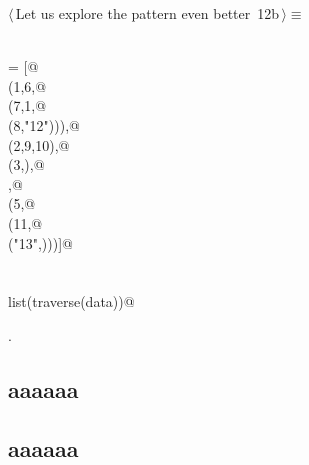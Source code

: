 \documentclass[11pt,oneside]{article}	%
\begin{document}
\begin{flushleft} \small \label{scrap28}
\protect{}$\langle\,$Let us explore the pattern even better\nobreak\ {\footnotesize 12b}$\,\rangle\equiv$
\vspace{-1ex}
\begin{list}{}{} \item
\mbox{}\verb@@\\
\mbox{}\verb@data = [@\\
\mbox{}\verb@   (1,6,@\\
\mbox{}\verb@      (7,1,@\\
\mbox{}\verb@         (8,"12"))),@\\
\mbox{}\verb@   (2,9,10),@\\
\mbox{}\verb@   (3,),@\\
\mbox{},@\\
\mbox{}\verb@   (5,@\\
\mbox{}\verb@      (11,@\\
\mbox{}\verb@      ("13",)))]@\\
\mbox{}\verb@@\\
\mbox{}\verb@@\\
\mbox{}\verb@print list(traverse(data))@\\
\mbox{}\verb@@{\NWsep}
\end{list}
\vspace{-1ex}
\footnotesize\addtolength{\baselineskip}{-1ex}
\begin{list}{}{\setlength{\itemsep}{-\parsep}\setlength{\itemindent}{-\leftmargin}}
\item {\NWtxtMacroNoRef}.
\end{list}
\end{flushleft}

\subsection{aaaaaa}
\subsection{aaaaaa}
\end{document}
